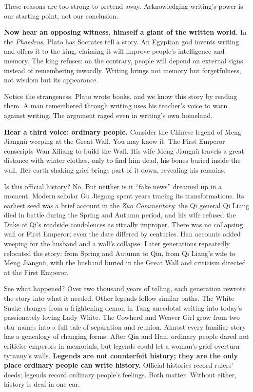 These reasons are too strong to pretend away. Acknowledging writing's power is our starting point, not our conclusion.

\textbf{Now hear an opposing witness, himself a giant of the written world.} In the \emph{Phaedrus}, Plato has Socrates tell a story. An Egyptian god invents writing and offers it to the king, claiming it will improve people's intelligence and memory. The king refuses: on the contrary, people will depend on external signs instead of remembering inwardly. Writing brings not memory but forgetfulness, not wisdom but its appearance.

Notice the strangeness. Plato wrote books, and we know this story by reading them. A man remembered through writing uses his teacher's voice to warn against writing. The argument raged even in writing's own homeland.

\textbf{Hear a third voice: ordinary people.} Consider the Chinese legend of Meng Jiangnü weeping at the Great Wall. You may know it. The First Emperor conscripts Wan Xiliang to build the Wall. His wife Meng Jiangnü travels a great distance with winter clothes, only to find him dead, his bones buried inside the wall. Her earth-shaking grief brings part of it down, revealing his remains.

Is this official history? No. But neither is it ``fake news'' dreamed up in a moment. Modern scholar Gu Jiegang spent years tracing its transformations. Its earliest seed was a brief account in the \emph{Zuo Commentary}: the Qi general Qi Liang died in battle during the Spring and Autumn period, and his wife refused the Duke of Qi's roadside condolences as ritually improper. There was no collapsing wall or First Emperor; even the date differed by centuries. Han accounts added weeping for the husband and a wall's collapse. Later generations repeatedly relocated the story: from Spring and Autumn to Qin, from Qi Liang's wife to Meng Jiangnü, with the husband buried in the Great Wall and criticism directed at the First Emperor.

See what happened? Over two thousand years of telling, each generation rewrote the story into what it needed. Other legends follow similar paths. The White Snake changes from a frightening demon in Tang anecdotal writing into today's passionately loving Lady White. The Cowherd and Weaver Girl grow from two star names into a full tale of separation and reunion. Almost every familiar story has a genealogy of changing forms. After Qin and Han, ordinary people dared not criticise emperors in memorials, but legends could let a woman's grief overturn tyranny's walls. \textbf{Legends are not counterfeit history; they are the only place ordinary people can write history.} Official histories record rulers' deeds; legends record ordinary people's feelings. Both matter. Without either, history is deaf in one ear.

